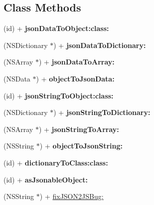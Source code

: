 \subsection*{Class Methods}
\begin{DoxyCompactItemize}
\item 
\mbox{\label{interface_alibc_j_s_o_n_a639e2854e719ef15b61ac23d68ef67d9}} 
(id) + {\bfseries json\+Data\+To\+Object\+:class\+:}
\item 
\mbox{\label{interface_alibc_j_s_o_n_a082acfe7183c19390b3148fd7f09de5d}} 
(N\+S\+Dictionary $\ast$) + {\bfseries json\+Data\+To\+Dictionary\+:}
\item 
\mbox{\label{interface_alibc_j_s_o_n_aa7a2c520a6abad73bfa57d6f33fab100}} 
(N\+S\+Array $\ast$) + {\bfseries json\+Data\+To\+Array\+:}
\item 
\mbox{\label{interface_alibc_j_s_o_n_a6b7e6e1df8405222f4efb1a5082e9b39}} 
(N\+S\+Data $\ast$) + {\bfseries object\+To\+Json\+Data\+:}
\item 
\mbox{\label{interface_alibc_j_s_o_n_ae13558f551b343435b635f9c2c22ef88}} 
(id) + {\bfseries json\+String\+To\+Object\+:class\+:}
\item 
\mbox{\label{interface_alibc_j_s_o_n_a9d5c89c32214fcf18bdf63314376cf11}} 
(N\+S\+Dictionary $\ast$) + {\bfseries json\+String\+To\+Dictionary\+:}
\item 
\mbox{\label{interface_alibc_j_s_o_n_a55963ed23b76f05accf934f376a18207}} 
(N\+S\+Array $\ast$) + {\bfseries json\+String\+To\+Array\+:}
\item 
\mbox{\label{interface_alibc_j_s_o_n_afa6596d34b6e271da657164745706c0d}} 
(N\+S\+String $\ast$) + {\bfseries object\+To\+Json\+String\+:}
\item 
\mbox{\label{interface_alibc_j_s_o_n_ab5a99e35876e2fca0b50ebfb42fe3427}} 
(id) + {\bfseries dictionary\+To\+Class\+:class\+:}
\item 
\mbox{\label{interface_alibc_j_s_o_n_af97a165657203793b22a0191595804b1}} 
(id) + {\bfseries as\+Jsonable\+Object\+:}
\item 
(N\+S\+String $\ast$) + \mbox{\hyperlink{interface_alibc_j_s_o_n_a8d8597e7758b604b034919211f251a52}{fix\+J\+S\+O\+N2\+J\+S\+Bug\+:}}
\end{DoxyCompactItemize}


